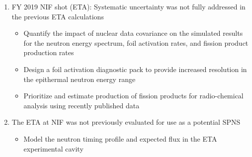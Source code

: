 \begin{enumerate}
	\item FY 2019 NIF shot (ETA): Systematic uncertainty was not fully addressed in the previous ETA calculations
	\begin{itemize}
		\item Quantify the impact of nuclear data covariance on the simulated results for the neutron energy spectrum, foil activation rates, and fission product production rates
		\item Design a foil activation diagnostic pack to provide increased resolution in the epithermal neutron energy range
		\item Prioritize and estimate production of fission products for radio-chemical analysis using recently published data
	\end{itemize} 

	\item The ETA at NIF was not previously evaluated for use as a potential SPNS
		\begin{itemize}
			\item Model the neutron timing profile and expected flux in the ETA experimental cavity
		\end{itemize}		

	

\end{enumerate} 


